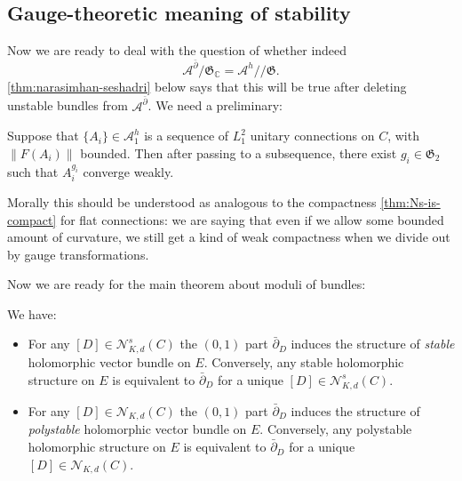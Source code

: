 \documentclass[12pt,letterpaper,reqno]{article}
\numberwithin{equation}{section}
\newcommand{\fG}{{\mathfrak G}}
\newcommand{\cN}{\ensuremath{\mathcal N}}
\newcommand{\cA}{\ensuremath{\mathcal A}}
\newcommand{\C}{\ensuremath{\mathbb C}}
\newcommand{\kq}{/\!\!/}
\newcommand{\norm}[1]{\lVert#1\rVert}
\newcommand{\ti}[1]{\textit{#1}}
\newcommand{\fixme}[1]{{\color{orange}{[#1]}}}
\begin{document}
\fixme{should discuss S-equivalence, passage
from semistable to the polystable associated graded?}


\subsection{Gauge-theoretic meaning of stability}

Now we are ready to deal with the question of whether indeed
\begin{equation}
  \cA^{\bar\partial} / \fG_\C = \cA^h \kq \fG.
\end{equation}
\autoref{thm:narasimhan-seshadri} below says that this will be true
after deleting unstable bundles from $\cA^{\bar\partial}$.
We need a preliminary:

\begin{thm} \label{thm:uhlenbeck-weak}
Suppose that $\{A_i\} \in \cA^h_1$ is a sequence of $L^2_1$ unitary 
connections on $C$, with $\norm{F(A_i)}$ bounded. Then after passing
to a subsequence, there exist $g_i \in \fG_2$ such that $A_i^{g_i}$
converge weakly.
\end{thm}

Morally this should be understood as analogous to the compactness
\autoref{thm:Ns-is-compact} for flat connections: we are saying that
even if we allow some bounded amount of curvature, we still get a 
kind of weak compactness when we divide out by gauge transformations.


Now we are ready for the main theorem about moduli of bundles:

\begin{thm}  \label{thm:narasimhan-seshadri}
We have:
\begin{itemize}
\item For any $[D] \in \cN^s_{K,d}(C)$ the $(0,1)$ part $\bar\partial_D$
induces the structure of \ti{stable} holomorphic vector bundle on $E$.
Conversely, any stable holomorphic structure 
on $E$ is equivalent to $\bar\partial_D$ for a unique $[D] \in \cN^s_{K,d}(C)$.
\item For any $[D] \in \cN_{K,d}(C)$ the $(0,1)$ part $\bar\partial_D$
induces the structure of \ti{polystable} holomorphic vector bundle on $E$.
Conversely, any polystable holomorphic structure 
on $E$ is equivalent to $\bar\partial_D$ for a unique $[D] \in \cN_{K,d}(C)$.
\end{itemize}
\end{thm}
\end{document}
